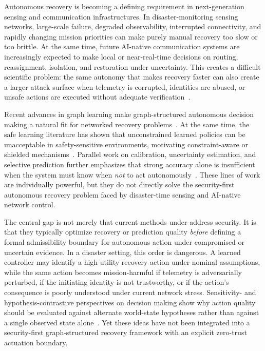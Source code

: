 \documentclass[10pt,journal,compsoc]{IEEEtran}
\begin{document}
Autonomous recovery is becoming a defining requirement in next-generation sensing and communication infrastructures.
In disaster-monitoring sensing networks, large-scale failure, degraded observability, interrupted connectivity, and rapidly changing mission priorities can make purely manual recovery too slow or too brittle.
At the same time, future AI-native communication systems are increasingly expected to make local or near-real-time decisions on routing, reassignment, isolation, and restoration under uncertainty.
This creates a difficult scientific problem: the same autonomy that makes recovery faster can also create a larger attack surface when telemetry is corrupted, identities are abused, or unsafe actions are executed without adequate verification~\cite{amodei2016concrete,rose2020nist}.

Recent advances in graph learning make graph-structured autonomous decision making a natural fit for networked recovery problems~\cite{kipf2017gcn,hamilton2017graphsage,velickovic2018gat,xu2019gin,gilmer2017mpnn,rossi2020tgn,yun2019gtn}.
At the same time, the safe learning literature has shown that unconstrained learned policies can be unacceptable in safety-sensitive environments, motivating constraint-aware or shielded mechanisms~\cite{garcia2015saferl,achiam2017cpo,alshiekh2018shielding,berkenkamp2017safe,brunke2022safe}.
Parallel work on calibration, uncertainty estimation, and selective prediction further emphasizes that strong accuracy alone is insufficient when the system must know when \emph{not} to act autonomously~\cite{gal2016dropout,guo2017calibration,angelopoulos2023conformal,geifman2017selective}.
These lines of work are individually powerful, but they do not directly solve the security-first autonomous recovery problem faced by disaster-time sensing and AI-native network control.

The central gap is not merely that current methods under-address security.
It is that they typically optimize recovery or prediction quality \emph{before} defining a formal admissibility boundary for autonomous action under compromised or uncertain evidence.
In a disaster setting, this order is dangerous.
A learned controller may identify a high-utility recovery action under nominal assumptions, while the same action becomes mission-harmful if telemetry is adversarially perturbed, if the initiating identity is not trustworthy, or if the action's consequence is poorly understood under current network stress.
Sensitivity- and hypothesis-contrastive perspectives on decision making show why action quality should be evaluated against alternate world-state hypotheses rather than against a single observed state alone~\cite{bottou2013counterfactual,pearl2016causal}.
Yet these ideas have not been integrated into a security-first graph-structured recovery framework with an explicit zero-trust actuation boundary.
\end{document}
